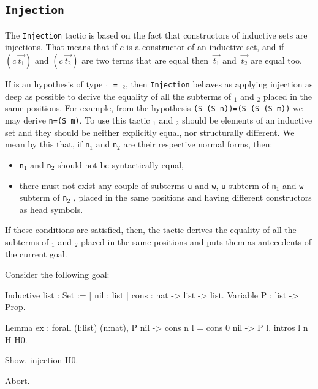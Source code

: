 \subsection{\tt Injection {\ident}}
\label{Injection}
The {\tt Injection} tactic is based on the fact that constructors of
inductive sets are injections. That means that if $c$ is a constructor
of an inductive set, and if $(c~\vec{t_1})$ and $(c~\vec{t_2})$ are two
terms that are equal then $~\vec{t_1}$ and $~\vec{t_2}$ are equal
too.

If {\ident} is an hypothesis of type {\tt {\term$_1$} = {\term$_2$}},
then {\tt Injection} behaves as applying injection as deep as possible to
derive the equality of all the subterms of {\term$_1$} and {\term$_2$}
placed in the same positions. For example, from the hypothesis {\tt (S
  (S n))=(S (S (S m))} we may derive {\tt n=(S m)}.  To use this
tactic {\term$_1$} and {\term$_2$} should be elements of an inductive
set and they should be neither explicitly equal, nor structurally
different. We mean by this that, if {\tt n$_1$} and {\tt n$_2$} are
their respective normal forms, then:
\begin{itemize}
\item {\tt n$_1$} and {\tt n$_2$} should not be syntactically equal,
\item there must not exist any couple of subterms {\tt u} and {\tt w},
  {\tt u} subterm of {\tt n$_1$} and {\tt w} subterm of {\tt n$_2$} ,
  placed in the same positions and having different constructors as
  head symbols.
\end{itemize}
If these conditions are satisfied, then, the tactic derives the
equality of all the subterms of {\term$_1$} and {\term$_2$} placed in
the same positions and puts them as antecedents of the current goal.

\Example Consider the following goal:

\begin{coq_example*}
Inductive list : Set :=
  | nil : list
  | cons : nat -> list -> list.
Variable P : list -> Prop.
\end{coq_example*}
\begin{coq_eval}
Lemma ex :
 forall (l:list) (n:nat), P nil -> cons n l = cons 0 nil -> P l.
intros l n H H0.
\end{coq_eval}
\begin{coq_example}
Show.
injection H0.
\end{coq_example}
\begin{coq_eval}
Abort.
\end{coq_eval}

